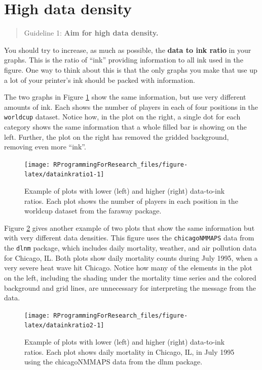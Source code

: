 \documentclass[]{book}
\theoremstyle{definition}
\theoremstyle{definition}
\theoremstyle{definition}
\theoremstyle{remark}
\begin{document}
\section{High data density}\label{high-data-density}

\begin{quote}
Guideline 1: \textbf{Aim for high data density.}
\end{quote}

You should try to increase, as much as possible, the \textbf{data to ink
ratio} in your graphs. This is the ratio of ``ink'' providing
information to all ink used in the figure. One way to think about this
is that the only graphs you make that use up a lot of your printer's ink
should be packed with information.

The two graphs in Figure \ref{fig:datainkratio1} show the same
information, but use very different amounts of ink. Each shows the
number of players in each of four positions in the \texttt{worldcup}
dataset. Notice how, in the plot on the right, a single dot for each
category shows the same information that a whole filled bar is showing
on the left. Further, the plot on the right has removed the gridded
background, removing even more ``ink''.

\begin{figure}

{\centering \texttt{[image: RProgrammingForResearch\_files/figure-latex/datainkratio1-1]} 

}

\caption{Example of plots with lower (left) and higher (right) data-to-ink ratios. Each plot shows the number of players in each position in the worldcup dataset from the faraway package.}\label{fig:datainkratio1}
\end{figure}

Figure \ref{fig:datainkratio2} gives another example of two plots that
show the same information but with very different data densities. This
figure uses the \texttt{chicagoNMMAPS} data from the \texttt{dlnm}
package, which includes daily mortality, weather, and air pollution data
for Chicago, IL. Both plots show daily mortality counts during July
1995, when a very severe heat wave hit Chicago. Notice how many of the
elements in the plot on the left, including the shading under the
mortality time series and the colored background and grid lines, are
unnecessary for interpreting the message from the data.

\begin{figure}

{\centering \texttt{[image: RProgrammingForResearch\_files/figure-latex/datainkratio2-1]} 

}

\caption{Example of plots with lower (left) and higher (right) data-to-ink ratios. Each plot shows daily mortality in Chicago, IL, in July 1995 using the chicagoNMMAPS data from the dlnm package.}\label{fig:datainkratio2}
\end{figure}
\end{document}
